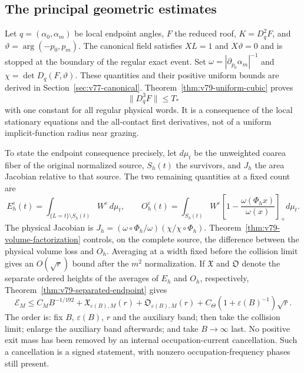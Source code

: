 \documentclass[11pt,reqno]{amsart}
\numberwithin{equation}{section}
\theoremstyle{definition}\newtheorem{definition}[theorem]{Definition}
\theoremstyle{remark}\newtheorem{remark}[theorem]{Remark}
\theoremstyle{definition}\newtheorem{inputstatement}[theorem]{Input statement}
\begin{document}
\subsection{The principal geometric estimates}
Let $q=(\alpha_0,\alpha_m)$ be local endpoint angles, $F$ the reduced
roof, $K=D_q^2F$, and $\vartheta=\arg(-p_0,p_m)$. The canonical field
satisfies $XL=1$ and $X\vartheta=0$ and is stopped at the boundary of
the regular exact event. Set $\omega=|\partial_{p_0}\alpha_m|^{-1}$ and
$\chi=\det D_q(F,\vartheta)$. These quantities and their positive
uniform bounds are derived in Section~\ref{sec:v77-canonical}.
Theorem~\ref{thm:v79-uniform-cubic} proves
\[
                         \|D_q^3F\|\le T_*
\]
with one constant for all regular physical words. It is a consequence
of the local stationary equations and the all-contact first derivatives,
not of a uniform implicit-function radius near grazing.

To state the endpoint consequence precisely, let $d\mu_t$ be the
unweighted coarea fiber of the original normalized source, $S_h(t)$
the survivors, and $J_h$ the area Jacobian relative to that source.
The two remaining quantities at a fixed count are
\[
 E_h^\varepsilon(t)=\int_{\{L=t\}\setminus S_h(t)}W^\varepsilon\,d\mu_t,
 \qquad
 O_h^\varepsilon(t)=\int_{S_h(t)}W^\varepsilon
                 \left[1-\frac{\omega(\Phi_hx)}{\omega(x)}\right]_+d\mu_t.
\]
The physical Jacobian is
$J_h=(\omega\circ\Phi_h/\omega)(\chi/\chi\circ\Phi_h)$.
Theorem~\ref{thm:v79-volume-factorization} controls, on the complete
source, the difference between the physical volume loss and $O_h$.
Averaging at a width fixed before the collision limit gives an
$O(\sqrt r)$ bound after the $m^2$ normalization. If $\mathfrak X$ and
$\mathfrak O$ denote the separate ordered heights of the averages of
$E_h$ and $O_h$, respectively, Theorem~\ref{thm:v79-separated-endpoint}
gives
\[
 \mathcal E_M\le C_MB^{-1/192}
       +\mathfrak X_{\varepsilon(B),M}(r)
       +\mathfrak O_{\varepsilon(B),M}(r)
       +C_\Theta(1+\varepsilon(B)^{-1})\sqrt r.
\]
The order is: fix $B$, $\varepsilon(B)$, $r$ and the auxiliary band;
then take the collision limit; enlarge the auxiliary band afterwards;
and take $B\to\infty$ last. No positive exit mass has been removed by
an internal occupation-current cancellation. Such a cancellation is a
signed statement, with nonzero occupation-frequency phases still present.
\end{document}
